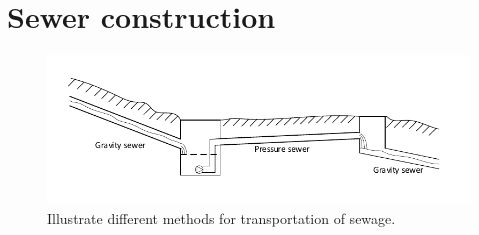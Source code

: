 \section{Sewer construction}\label{se:sewer_construction}

\begin{figure}[H]
\centering
\includegraphics[width=1\textwidth]{report/introduction/pictures/Sewer_drawing.pdf}
\caption{Illustrate different methods for transportation of sewage.}
\label{fig:Sewer_drawing}
\end{figure}
